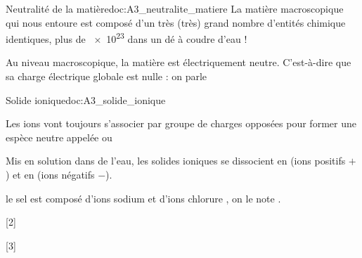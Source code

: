 \begin{doc}{Neutralité de la matière}{doc:A3_neutralite_matiere}
  La matière macroscopique qui nous entoure est composé d'un très (très) grand nombre d'entités chimique identiques, plus de \num{e23} dans un dé à coudre d'eau !
  
  \begin{importants}
    Au niveau macroscopique, la matière est électriquement neutre.
    C'est-à-dire que sa charge électrique globale est nulle : on parle 
  \end{importants}
\end{doc}

\begin{doc}{Solide ionique}{doc:A3_solide_ionique}
  \begin{importants}
    Les ions vont toujours s'associer par groupe de charges opposées pour former une espèce neutre appelée  ou 
  \end{importants}
  
  Mis en solution dans de l'eau, les solides ioniques se dissocient en  (ions positifs $+$) et en  (ions négatifs $-$).
  
  \exemple le sel est composé d'ions sodium  et d'ions chlorure \chlorure, on le note .
\end{doc}

\pasCorrection{\newpage \vspace*{-30pt}}
[2]

[3]




